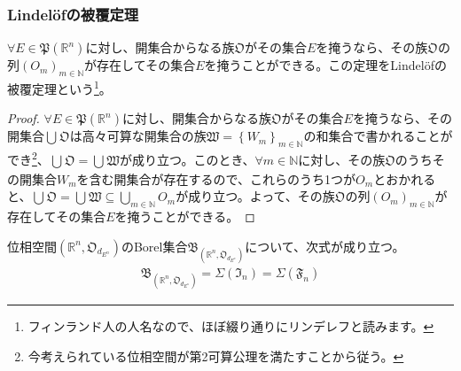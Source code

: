 \documentclass[dvipdfmx]{jsarticle}
\begin{document}
\subsubsection{Lindelöfの被覆定理}%
\begin{thm}\label{4.5.4.7}
$\forall E \in \mathfrak{P}\left( \mathbb{R}^{n} \right)$に対し、開集合からなる族$\mathfrak{O}$がその集合$E$を掩うなら、その族$\mathfrak{O}$の列$\left( O_{m} \right)_{m \in \mathbb{N}}$が存在してその集合$E$を掩うことができる。この定理をLindelöfの被覆定理という\footnote{フィンランド人の人名なので、ほぼ綴り通りにリンデレフと読みます。}。
\end{thm}
\begin{proof}
$\forall E \in \mathfrak{P}\left( \mathbb{R}^{n} \right)$に対し、開集合からなる族$\mathfrak{O}$がその集合$E$を掩うなら、その開集合$\bigcup_{} \mathfrak{O}$は高々可算な開集合の族$\mathfrak{W} =\left\{ W_{m} \right\}_{m \in \mathbb{N}}$の和集合で書かれることができ\footnote{今考えられている位相空間が第2可算公理を満たすことから従う。}、$\bigcup_{} \mathfrak{O} = \bigcup_{} \mathfrak{W}$が成り立つ。このとき、$\forall m \in \mathbb{N}$に対し、その族$\mathfrak{O}$のうちその開集合$W_{m}$を含む開集合が存在するので、これらのうち1つが$O_{m}$とおかれると、$\bigcup_{} \mathfrak{O} = \bigcup_{} \mathfrak{W} \subseteq \bigcup_{m \in \mathbb{N}} O_{m}$が成り立つ。よって、その族$\mathfrak{O}$の列$\left( O_{m} \right)_{m \in \mathbb{N}}$が存在してその集合$E$を掩うことができる。
\end{proof}
\begin{thm}\label{4.5.4.8}
位相空間$\left( \mathbb{R}^{n},\mathfrak{O}_{d_{E^{n}}} \right)$のBorel集合$\mathfrak{B}_{\left( \mathbb{R}^{n},\mathfrak{O}_{d_{E^{n}}} \right)}$について、次式が成り立つ。
\begin{align*}
\mathfrak{B}_{\left( \mathbb{R}^{n},\mathfrak{O}_{d_{E^{n}}} \right)} = \varSigma\left( \mathfrak{I}_{n} \right) = \varSigma\left( \mathfrak{F}_{n} \right)
\end{align*}
\end{thm}
\end{document}
